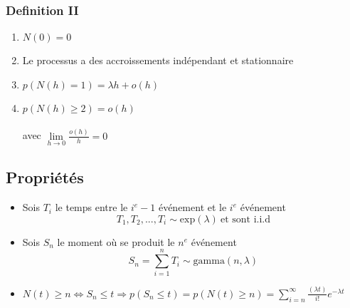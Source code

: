 \documentclass[13pt]{article}
\begin{document}
\subsubsection*{Definition II}
\begin{enumerate}
  \item $N(0) = 0$
  \item Le processus a des accroissements indépendant et stationnaire
  \item $p(N(h) = 1) = \lambda h + o(h)$
  \item $p(N(h) \geq 2) = o(h)$ \\ \\ avec $\lim\limits_{h \to 0} \frac{o(h)}{h} = 0 $
\end{enumerate}

\subsection*{Propriétés}
\begin{itemize}
  \item Sois $T_i$ le temps entre le $i^e - 1$ événement et le $i^e$ événement
        \[ T_1, T_2, ... ,T_i  \sim \text{exp}(\lambda)\: \text{et sont i.i.d} \]
  \item Sois $S_n$ le moment où se produit le $n^e$ événement
        \[ S_n = \sum_{i=1}^n T_i \sim \text{gamma}(n, \lambda) \]
  \item $N(t) \geq n \Leftrightarrow S_n \leq t \Rightarrow  p(S_n \leq t) = p(N(t) \geq n) = \sum\limits_{i = n}^\infty \frac{(\lambda t )}{i!} e^{-\lambda t} $
\end{itemize}
\end{document}
